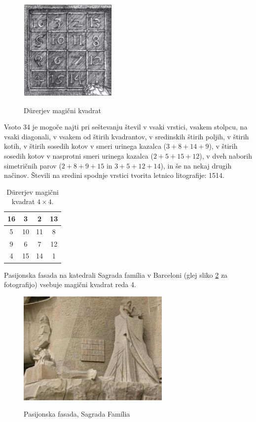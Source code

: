 \documentclass[a4paper,12pt]{article}
\theoremstyle{definition}
\theoremstyle{plain}
\newenvironment{magic}[3]{
   \begin{table}[h]
      \Large
      \centering
      \caption{#1}
      \label{#3}
      \begin{tabular}{|*{#2}{c|}}
         \hline
         }{
      \end{tabular}
   \end{table}
}
\begin{document}

\begin{figure}[h]
   \centering
   \caption{Dürerjev magični kvadrat}
   \includegraphics[scale=1.5]{durer.png}
   \label{fig:durer}
\end{figure}

Vsoto 34 je mogoče najti pri seštevanju števil v vsaki vrstici, vsakem stolpcu,
na vsaki diagonali, v vsakem od štirih kvadrantov, v sredinskih štirih poljih,
v štirih kotih, v štirih sosedih kotov v smeri urinega kazalca ($3+8+14+9$), v
štirih sosedih kotov v nasprotni smeri urinega kazalca ($2+5+15+12$), v dveh naborih
simetričnih parov ($2+8+9+15$ in $3+5+12+14$), in še na nekaj drugih načinov.
Števili na sredini spodnje vrstici tvorita letnico litografije: 1514.



\begin{magic}{Dürerjev magični kvadrat $4\times 4$.}{4}{table:durer}
   16 &  3 &  2 & 13 \\\hline
   5 & 10 & 11 &  8 \\\hline
   9 &  6 &  7 & 12 \\\hline
   4 & 15 & 14 &  1 \\\hline
\end{magic}





Pasijonska fasada na katedrali Sagrada família v Barceloni
(glej sliko \ref{fig:sagrada} za fotografijo) vsebuje magični kvadrat reda 4.

\begin{figure}[h]
   \centering
   \caption{Pasijonska fasada, Sagrada Família}
   \includegraphics{sagrada.png}
   \label{fig:sagrada}
\end{figure}
\end{document}
